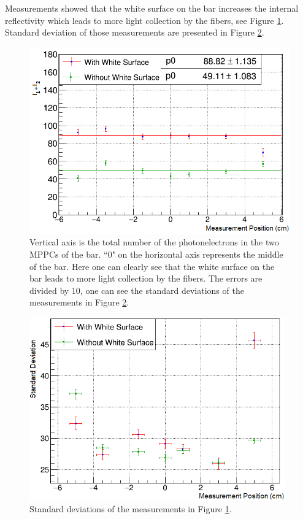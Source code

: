 \documentclass[a4paper]{article}\linespread{1.4}
\begin{document}
Measurements showed that the white surface on the bar increases the internal reflectivity which leads to more light collection by the fibers, see Figure \ref{fig:s0ps1}. Standard deviation of those measurements are presented in Figure \ref{fig:s0ps1e}.
\begin{figure}[] \centering \includegraphics[width=120mm,scale=1.0]{figures/s0ps1.png} \caption{Vertical axis is the total number of the photonelectrons in the two MPPCs of the bar. ``0" on the horizontal axis represents the middle of the bar. Here one can clearly see that the white surface on the bar leads to more light collection by the fibers.  The errors are divided by 10, one can see the standard deviations of the measurements in Figure \ref{fig:s0ps1e}.} \label{fig:s0ps1} \end{figure}  
\begin{figure}[] \centering \includegraphics[width=110mm,scale=1.0]{figures/s0ps1e.png} \caption{Standard deviations of the measurements in Figure \ref{fig:s0ps1}.}\label{fig:s0ps1e} \end{figure}  
\end{document}
